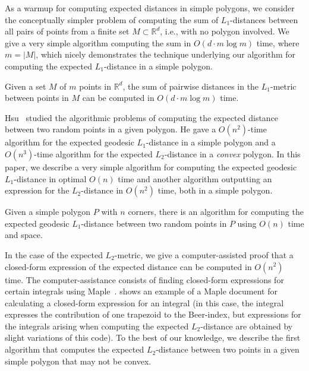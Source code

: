 \documentclass{article}
\begin{document}
As a warmup for computing expected distances in simple polygons, we consider the conceptually simpler problem of computing the sum of $L_1$-distances between all pairs of points from a finite set $M\subset\mathbb R^d$, i.e., with no polygon involved.
We give a very simple algorithm computing the sum in $O(d\cdot m\log m)$ time, where $m=\vert M\vert$, which nicely demonstrates the technique underlying our algorithm for computing the expected $L_1$-distance in a simple polygon.

\begin{theorem}\label{thm:L1points}
Given a set $M$ of $m$ points in $\mathbb{R}^d$, the sum of pairwise distances in the $L_1$-metric between points in $M$ can be computed in $O(d\cdot m\log m)$ time.
\end{theorem}

Hsu~\cite{hsu1990expected} studied the algorithmic problems of computing the expected distance between two random points in a given polygon.
He gave a $O(n^2)$-time algorithm for the expected geodesic $L_1$-distance in a simple polygon and a $O(n^3)$-time algorithm for the expected $L_2$-distance in a \emph{convex} polygon.
In this paper, we describe a very simple algorithm for computing the expected geodesic $L_1$-distance in optimal $O(n)$ time and another algorithm outputting an expression for the $L_2$-distance in $O(n^2)$ time, both in a simple polygon.

\begin{theorem}\label{thmL1}
Given a simple polygon $P$ with $n$ corners, there is an algorithm for computing the expected geodesic $L_1$-distance between two random points in $P$ using $O(n)$ time and space.
\end{theorem}

In the case of the expected $L_2$-metric, we give a computer-assisted proof that a closed-form expression of the expected distance can be computed in $O(n^2)$ time.
The computer-assistance consists of finding closed-form expressions for certain integrals using Maple~\cite{maple}.
 shows an example of a Maple document for calculating a closed-form expression for an integral (in this case, the integral expresses the contribution of one trapezoid to the Beer-index, but expressions for the integrals arising when computing the expected $L_2$-distance are obtained by slight variations of this code).
To the best of our knowledge, we describe the first algorithm that computes the expected $L_2$-distance between two points in a given simple polygon that may not be convex.
\end{document}
